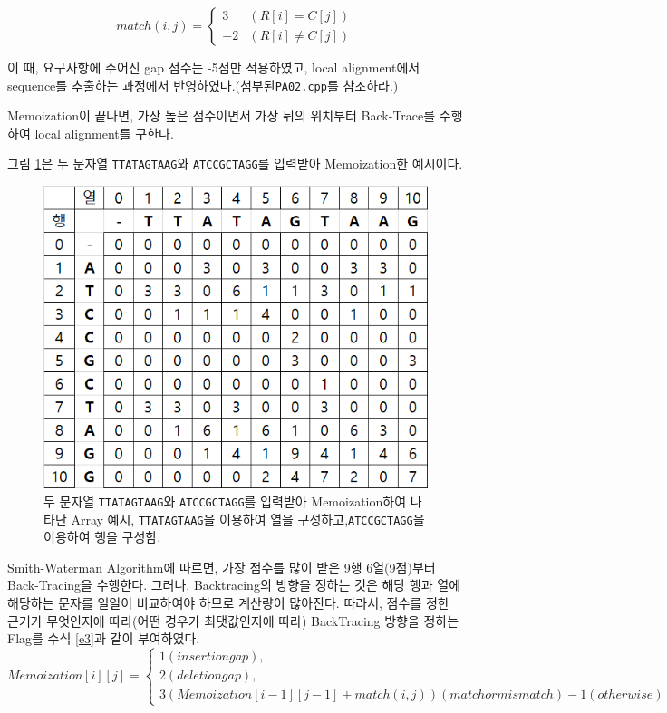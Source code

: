 \documentclass[10pt,a4paper]{article}
\begin{document}
\begin{spacing}{1.6}
    \begin{equation}
    	match(i,j) = \begin{cases} 3&( R[i]=C[j] )\\ -2&( R[i] \neq C[j] ) \end{cases}
    \label{e2}
    \end{equation}
	 
    이 때, 요구사항에 주어진 gap 점수는 -5점만 적용하였고, local alignment에서 sequence를 추출하는 과정에서 반영하였다.(첨부된\texttt{PA02.cpp}를 참조하라.)
    
    Memoization이 끝나면, 가장 높은 점수이면서 가장 뒤의 위치부터 Back-Trace를 수행하여 local alignment를 구한다. 
    
    그림 \ref{f1}은 두 문자열 \texttt{TTATAGTAAG}와 \texttt{ATCCGCTAGG}를 입력받아 Memoization한 예시이다.
    \begin{figure}
    	\centering
    	\includegraphics[scale=1]{Fig1.png}
    	\caption{두 문자열 \texttt{TTATAGTAAG}와 \texttt{ATCCGCTAGG}를 입력받아 Memoization하여 나타난 Array 예시, \texttt{TTATAGTAAG}을 이용하여 열을 구성하고,\texttt{ATCCGCTAGG}을 이용하여 행을 구성함.}
    	\label{f1}
    \end{figure}

    Smith-Waterman Algorithm에 따르면, 가장 점수를 많이 받은 9행 6열(9점)부터 Back-Tracing을 수행한다. 그러나, Backtracing의 방향을 정하는 것은 해당 행과 열에 해당하는 문자를 일일이 비교하여야 하므로 계산량이 많아진다. 따라서, 점수를 정한 근거가 무엇인지에 따라(어떤 경우가 최댓값인지에 따라) BackTracing 방향을 정하는 Flag를 수식 \ref{e3}과 같이 부여하였다. 
    \begin{equation}
    	Memoization[i][j] =\begin{cases} 
    	1 (insertion gap), \\
    	2 (deletion gap),\\
    	3 (Memoization[i-1][j-1] + match(i,j)) (match or mismatch)
    	-1 (otherwise)
    	\end{cases}
    	\label{e3}
    \end{equation}
    

\end{spacing}
\end{document}
